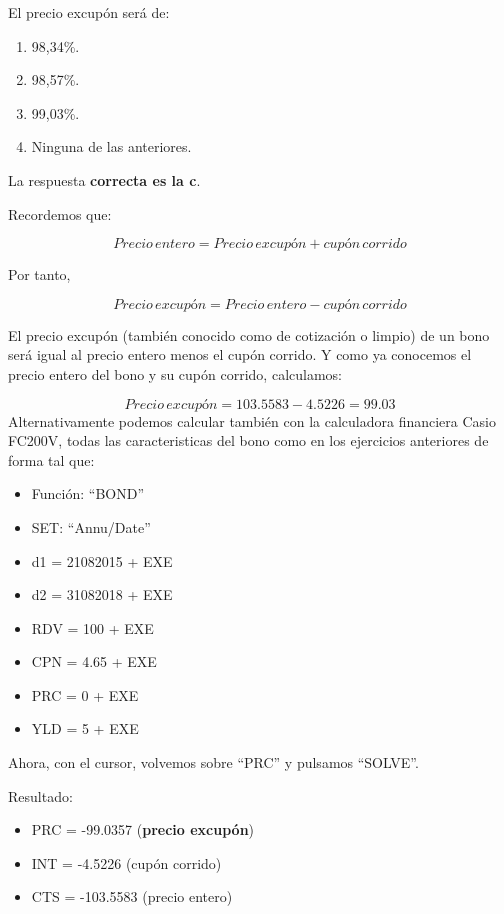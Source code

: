 \documentclass[
  letterpaper,
  DIV=11,
  numbers=noendperiod]{scrreprt}
\begin{document}
El precio excupón será de:

\begin{enumerate}
\def\labelenumi{\alph{enumi}.}
\item
  98,34\%.
\item
  98,57\%.
\item
  99,03\%.
\item
  Ninguna de las anteriores.
\end{enumerate}

\begin{tcolorbox}[enhanced jigsaw, left=2mm, opacityback=0, colback=white, breakable, arc=.35mm, bottomrule=.15mm, rightrule=.15mm, toprule=.15mm, leftrule=.75mm, colframe=quarto-callout-tip-color-frame]
\begin{minipage}[t]{5.5mm}
\textcolor{quarto-callout-tip-color}{\faLightbulb}
\end{minipage}%
\begin{minipage}[t]{\textwidth - 5.5mm}

La respuesta \textbf{correcta es la c}.

Recordemos que:

\[Precio\,entero = Precio\,excupón + cupón\,corrido\]

Por tanto,

\[Precio\,excupón = Precio\,entero - cupón\,corrido\]

El precio excupón (también conocido como de cotización o limpio) de un
bono será igual al precio entero menos el cupón corrido. Y como ya
conocemos el precio entero del bono y su cupón corrido, calculamos:

\[Precio\,excupón = 103.5583 - 4.5226 = 99.03\] Alternativamente podemos
calcular también con la calculadora financiera Casio FC200V, todas las
caracteristicas del bono como en los ejercicios anteriores de forma tal
que:

\begin{itemize}
\item
  Función: ``BOND''
\item
  SET: ``Annu/Date''
\item
  d1 = 21082015 + EXE
\item
  d2 = 31082018 + EXE
\item
  RDV = 100 + EXE
\item
  CPN = 4.65 + EXE
\item
  PRC = 0 + EXE
\item
  YLD = 5 + EXE
\end{itemize}

Ahora, con el cursor, volvemos sobre ``PRC'' y pulsamos ``SOLVE''.

Resultado:

\begin{itemize}
\item
  PRC = -99.0357 (\textbf{precio excupón})
\item
  INT = -4.5226 (cupón corrido)
\item
  CTS = -103.5583 (precio entero)
\end{itemize}

\end{minipage}%
\end{tcolorbox}
\end{document}
